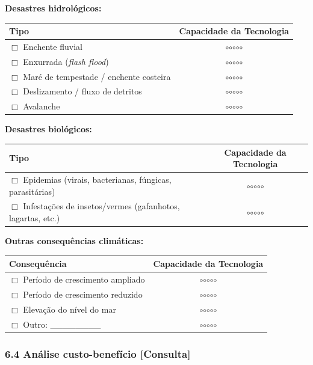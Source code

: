 \textbf{Desastres hidrológicos:}

{
\begin{longtable}[]{@{}lc@{}}
\toprule\noalign{}
Tipo & Capacidade da Tecnologia \\
\midrule\noalign{}
\endhead
\bottomrule\noalign{}
\endlastfoot
$\Box$ Enchente fluvial & $\circ$$\circ$$\circ$$\circ$$\circ$ \\
$\Box$ Enxurrada (\emph{flash flood}) & $\circ$$\circ$$\circ$$\circ$$\circ$ \\
$\Box$ Maré de tempestade / enchente costeira & $\circ$$\circ$$\circ$$\circ$$\circ$ \\
$\Box$ Deslizamento / fluxo de detritos & $\circ$$\circ$$\circ$$\circ$$\circ$ \\
$\Box$ Avalanche & $\circ$$\circ$$\circ$$\circ$$\circ$ \\
\end{longtable}
}

\textbf{Desastres biológicos:}

{
\begin{longtable}[]{@{}lc@{}}
\toprule\noalign{}
Tipo & Capacidade da Tecnologia \\
\midrule\noalign{}
\endhead
\bottomrule\noalign{}
\endlastfoot
$\Box$ Epidemias (virais, bacterianas, fúngicas, parasitárias) & $\circ$$\circ$$\circ$$\circ$$\circ$ \\
$\Box$ Infestações de insetos/vermes (gafanhotos, lagartas, etc.) & $\circ$$\circ$$\circ$$\circ$$\circ$ \\
\end{longtable}
}

\textbf{Outras consequências climáticas:}

{
\begin{longtable}[]{@{}lc@{}}
\toprule\noalign{}
Consequência & Capacidade da Tecnologia \\
\midrule\noalign{}
\endhead
\bottomrule\noalign{}
\endlastfoot
$\Box$ Período de crescimento ampliado & $\circ$$\circ$$\circ$$\circ$$\circ$ \\
$\Box$ Período de crescimento reduzido & $\circ$$\circ$$\circ$$\circ$$\circ$ \\
$\Box$ Elevação do nível do mar & $\circ$$\circ$$\circ$$\circ$$\circ$ \\
$\Box$ Outro: \_\_\_\_\_\_\_\_ & $\circ$$\circ$$\circ$$\circ$$\circ$ \\
\end{longtable}
}

\subsubsection{6.4 Análise custo-benefício {[Consulta]}}\label{anuxe1lise-custo-benefuxedcio}

